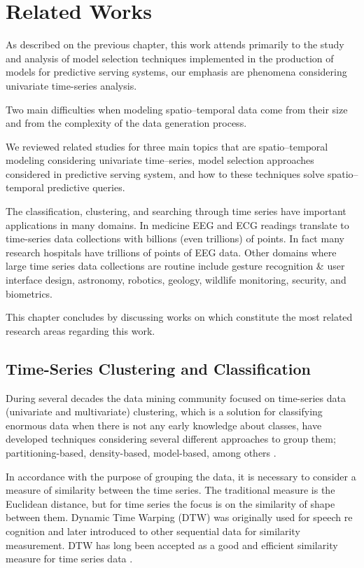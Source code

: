 \chapter{Related Works}\label{chapter_Related_Works}

As described on the previous chapter, this work attends primarily to the study and analysis of model selection techniques implemented in the production of models for predictive serving systems, our emphasis are phenomena considering univariate time-series analysis. 

Two main difficulties when modeling spatio--temporal data come from their size and from the complexity of the data generation process. \cite{}

We reviewed related studies for three main topics that are spatio--temporal modeling considering univariate time--series, model selection approaches considered in predictive serving system, and how to these techniques solve spatio--temporal predictive queries.

The classification, clustering, and searching through time series have important applications in many domains. In medicine EEG and ECG readings translate to time-series data collections with billions (even trillions) of points. In fact many research hospitals have trillions of points of EEG data. Other domains where large time series data collections are routine include gesture recognition \& user interface design, astronomy, robotics, geology, wildlife monitoring, security, and biometrics. 

This chapter concludes by discussing works on which constitute the most related research areas regarding this work.

\section{Time-Series Clustering and Classification}
\label{Sec:ClusteringRelatedWorks}

During several decades the data mining community focused on time-series data (univariate and multivariate) clustering, which is a solution for classifying enormous data when there is not any early knowledge about classes, have developed techniques considering several different approaches to group them; partitioning-based, density-based, model-based, among others \cite{}. 

In accordance with the purpose of grouping the data, it is necessary to consider a measure of similarity between the time series. The traditional measure is the Euclidean distance, but for time series the focus is on the similarity of shape between them. Dynamic Time Warping (DTW) was originally used for speech re cognition and later introduced to other sequential data for similarity measurement. DTW has long been accepted as a good and efficient similarity measure for time series data \cite{}.

